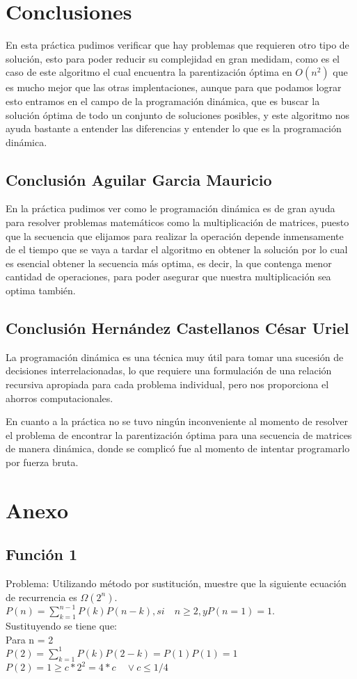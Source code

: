 \documentclass[12pt,twoside]{article}
\begin{document}
\section{Conclusiones}
    	En esta pr\'{a}ctica pudimos verificar que hay problemas que requieren otro tipo de solución, esto para poder reducir su complejidad en gran medidam, como es el caso de este algoritmo el cual encuentra la parentización óptima en $O(n^2)$ que es mucho mejor que las otras implentaciones, aunque para que podamos lograr esto entramos en el campo de la programación dinámica, que es buscar la solución óptima de todo un conjunto de soluciones posibles, y este algoritmo nos ayuda bastante a entender las diferencias y entender lo que es la programación dinámica.
\subsection{Conclusión Aguilar Garcia Mauricio }
   En la práctica pudimos ver como le programación dinámica es de gran ayuda para resolver problemas matemáticos como la multiplicación de matrices, puesto que la secuencia que elijamos para realizar la operación depende inmensamente de el tiempo que se vaya a tardar el algoritmo en obtener la solución por lo cual es esencial obtener la secuencia más optima, es decir, la que contenga menor cantidad de operaciones, para poder asegurar que nuestra multiplicación sea optima también.
\subsection{Conclusión Hernández Castellanos César Uriel}
    La programación dinámica es una técnica muy útil para tomar una sucesión de decisiones interrelacionadas, lo que requiere una formulación de una relación recursiva apropiada para cada problema individual, pero nos proporciona el ahorros computacionales.
    
    En cuanto a la práctica no se tuvo ningún inconveniente al momento de resolver el problema de encontrar la parentización óptima para una secuencia de matrices de manera dinámica, donde se complicó fue al momento de intentar programarlo por fuerza bruta.
\section{Anexo}
\subsection{Funci\'{o}n 1}  
Problema: Utilizando método por sustitución, muestre que la siguiente ecuación de recurrencia es $\Omega(2^n)$.\\
$P(n) = \sum_{k = 1}^{n-1}P(k)P(n-k), si\quad n\geq 2, y P(n=1)=1.$\\
Sustituyendo se tiene que:\\
Para n = 2\\
$P(2) = \sum_{k = 1}^{1}P(k)P(2-k) = P(1)P(1) = 1$\\
$P(2) = 1 \geq c*2^2 = 4*c \quad \vee c \leq 1/4$\\\\
\end{document}
